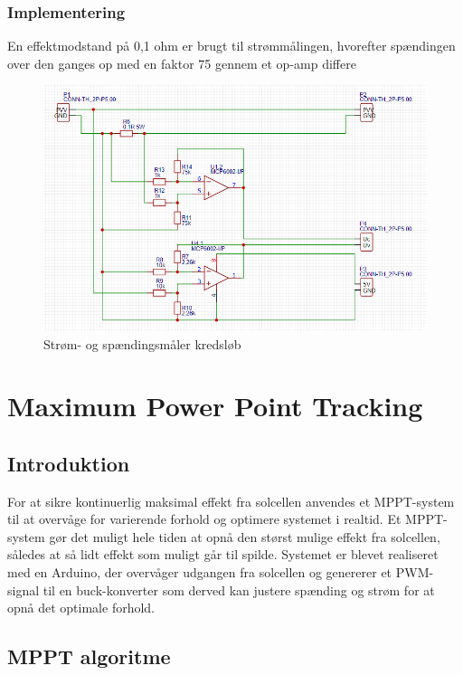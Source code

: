 \documentclass[../main.tex]{subfiles}
\begin{document}
        \subsubsection{Implementering}

        En effektmodstand på 0,1 ohm er brugt til strømmålingen, hvorefter spændingen over den ganges op med en faktor 75 gennem et op-amp differe

        \begin{figure}[H]
        \includegraphics[width=\textwidth]{Dokumentation/målekredsløb.png}
        \caption{Strøm- og spændingsmåler kredsløb}
        \label{fig: Strøm- og spændingsmåler kredsløb}
        \end{figure}

\section{Maximum Power Point Tracking}
    \subsection{Introduktion}

    For at sikre kontinuerlig maksimal effekt fra solcellen anvendes et MPPT-system til at overvåge for varierende forhold og optimere systemet i realtid. Et MPPT-system gør det muligt hele tiden at opnå den størst mulige effekt fra solcellen, således at så lidt effekt som muligt går til spilde. Systemet er blevet realiseret med en Arduino, der overvåger udgangen fra solcellen og genererer et PWM-signal til en buck-konverter som derved kan justere spænding og strøm for at opnå det optimale forhold. 

    \subsection{MPPT algoritme}
\end{document}
